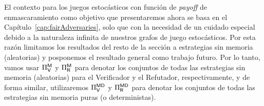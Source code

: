 El contexto para los juegos estocásticos con función de \emph{payoff} de enmascaramiento como objetivo que presentaremos ahora se basa en el Capítulo~\ref{cap:fairAdversaries}, solo que con la necesidad de un cuidado especial debido a la naturaleza infinita de nuestros grafos de juego estocásticos.
%
Por esta razón limitamos los resultados del resto de la sección a estrategias sin memoria (aleatorias) y posponemos el resultado general como trabajo futuro.
%
Por lo tanto, vamos usar $\Pi_{\mathsf{V}}^{\mathsf{M}}$ y
$\Pi_{\mathsf{R}}^{\mathsf{M}}$ para denotar los conjuntos de todas las estrategias sin memoria (aleatorias) para el Verificador y el Refutador,
respectivamente, y de forma similar, utilizaremos
$\Pi_{\mathsf{V}}^{\mathsf{M}\mathsf{D}}$ y
$\Pi_{\mathsf{R}}^{\mathsf{M}\mathsf{D}}$ para denotar los conjuntos de todas las estrategias sin memoria puras (o deterministas).






